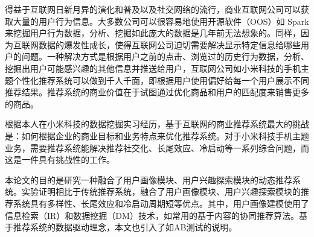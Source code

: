 \begin{cnabstract}
得益于互联网日新月异的演化和普及以及社交网络的流行，商业互联网公司可以获取大量的用户行为信息。大多数公司可以很容易地使用开源软件（OOS）如 Spark 来挖掘用户行为数据，分析、挖掘如此庞大的数据是几年前无法想象的。同样，因为互联网数据的爆发性成长，使得互联网公司迫切需要解决显示特定信息给哪些用户的问题。一种解决方式是根据用户之前的点击、浏览过的历史行为数据，分析、挖掘出用户可能感兴趣的其他信息并推送给用户，互联网公司如小米科技的手机主题个性化推荐系统可以做到千人千面，即根据用户使用偏好给每一个用户展示不同推荐结果。推荐系统的商业价值在于试图通过优化商品和用户的匹配度来销售更多的商品。

根据本人在小米科技的数据挖掘实习经历，基于互联网的商业推荐系统最大的挑战是：如何根据企业的商业目标和业务特点来优化推荐系统。对于小米科技手机主题业务，需要推荐系统能解决推荐社交化、长尾效应、冷启动等一系列综合问题，而这是一件具有挑战性的工作。

本论文的目的是研究一种融合了用户画像模块、用户兴趣探索模块的动态推荐系统。实验证明相比于传统推荐系统，融合了用户画像模块、用户兴趣探索模块的推荐系统具有多样性、长尾效应和冷启动周期短等优点。其中，用户画像建模使用了信息检索（IR）和数据挖掘（DM）技术，如常用的基于内容的协同推荐算法。基于推荐系统的数据驱动理念，本文也引入了如AB测试的说明。

\end{cnabstract}

